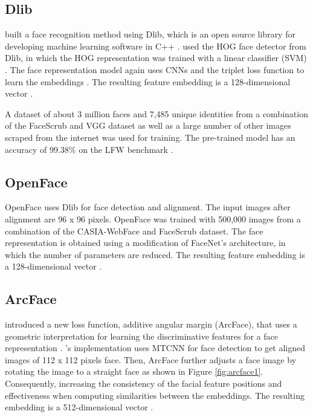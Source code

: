 \documentclass[12pt,english]{article}
\begin{document}
\subsection{Dlib}
\quad
\cite{geitgey} built a face recognition method using Dlib, which is an open source library for developing machine learning software in C++ \cite{king}. \cite{geitgey} used the HOG face detector from Dlib, in which the HOG representation was trained with a linear classifier (SVM) \cite{king2014}. The face representation model again uses CNNs and the triplet loss function to learn the embeddings \cite{king2017}. The resulting feature embedding is a 128-dimensional vector \cite{king2017}. 

A dataset of about 3 million faces and 7,485 unique identities from a combination of the FaceScrub and VGG dataset as well as a large number of other images scraped from the internet was used for training. The pre-trained model has an accuracy of $99.38\%$ on the LFW benchmark \cite{king2017}.


\subsection{OpenFace}
\quad
OpenFace uses Dlib for face detection and alignment. The input images after alignment are 96 x 96 pixels. OpenFace was trained with 500,000 images from a combination of the CASIA-WebFace and FaceScrub dataset. The face representation is obtained using a modification of FaceNet's architecture, in which the number of parameters are reduced. The resulting feature embedding is a 128-dimensional vector \cite{amos}.

\subsection{ArcFace}
\quad
\cite{deng} introduced a new loss function, additive angular margin (ArcFace), that uses a geometric interpretation for learning the discriminative features for a face representation \cite{deng}. \cite{deng2019}'s implementation uses MTCNN for face detection to get aligned images of 112 x 112 pixels face. Then, ArcFace further adjusts a face image by rotating the image to a straight face as shown in Figure \ref{fig:arcface1}. Consequently, increasing the consistency of the facial feature positions and effectiveness when computing similarities between the embeddings. The resulting embedding is a 512-dimensional vector \cite{deng}.
\end{document}
